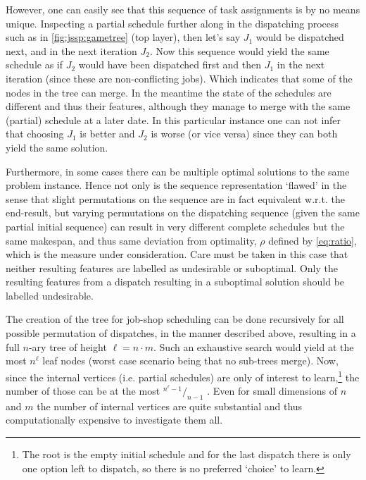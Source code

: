 \documentclass[smallextended]{llncs}
\begin{document}
However, one can easily see that this sequence of task assignments is by no means unique. Inspecting a partial 
schedule further along in the dispatching process such as in  \cref{fig:jssp:gametree} (top layer), then let's say 
$J_1$ 
would be dispatched next, and in the next iteration $J_2$. Now this sequence would yield the same schedule as if $J_2$ 
would have been dispatched first and then $J_1$ in the next iteration (since these are non-conflicting jobs). Which 
indicates that some of the nodes in the tree can merge. In the meantime the state of the schedules are different and 
thus their features, although they manage to merge with the same (partial) schedule at a later date.  %
In this particular instance one can not infer that choosing $J_1$ is better and $J_2$ is worse (or vice versa) since they can both yield the same solution.


Furthermore, in some cases there can be multiple optimal solutions to the same problem instance. Hence not only is the 
sequence representation `flawed' in the sense that slight permutations on the sequence are in fact equivalent w.r.t. 
the end-result, but varying permutations on the dispatching sequence (given the same partial initial sequence) can 
result in very different complete schedules but the same makespan, and thus same deviation from optimality, $\rho$ 
defined by \cref{eq:ratio}, which is the measure under consideration. Care must be taken in this case that neither 
resulting features are labelled as undesirable or suboptimal. Only the resulting features from a dispatch resulting in 
a suboptimal solution should be labelled undesirable. 

The creation of the tree for job-shop scheduling can be done recursively for all possible permutation of dispatches, 
in the manner described above, resulting in a full \mbox{$n$-ary} tree %
of height $\ell=n\cdot m$. Such an exhaustive search would yield at the most $n^{\ell}$ leaf nodes (worst case scenario being that no sub-trees merge). Now, since the internal vertices (i.e. partial schedules) are only of interest to learn,\footnote{The root is the empty initial schedule and for the last dispatch there is only one option left to dispatch, so there is no preferred `choice' to learn.} the number of those can be at the most \mbox{${}^{n^{\ell}-1}/_{n-1}$} \cite{Rosen03}.
Even for small dimensions of $n$ and $m$ the number of internal vertices are quite substantial and thus 
computationally expensive to investigate them all. 
\end{document}
